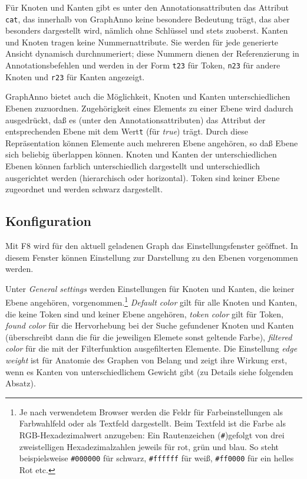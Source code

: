 \documentclass[12pt]{scrartcl}
\begin{document}
Für Knoten und Kanten gibt es unter den Annotationsattributen das Attribut \texttt{cat}, das innerhalb von GraphAnno keine besondere Bedeutung trägt, das aber besonders dargestellt wird, nämlich ohne Schlüssel und stets zuoberst.
Kanten und Knoten tragen keine Nummernattribute. Sie werden für jede generierte Ansicht dynamisch durchnumeriert; diese Nummern dienen der Referenzierung in Annotationsbefehlen und werden in der Form \texttt{t23} für Token, \texttt{n23} für andere Knoten und \texttt{r23} für Kanten angezeigt. 

GraphAnno bietet auch die Möglichkeit, Knoten und Kanten unterschiedlichen Ebenen zuzuordnen. Zugehörigkeit eines Elements zu einer Ebene wird dadurch ausgedrückt, daß es (unter den Annotationsattributen) das Attribut der entsprechenden Ebene mit dem Wert\texttt{t} (für \textit{true}) trägt. Durch diese Repräsentation können Elemente auch mehreren Ebene angehören, so daß Ebene sich beliebig überlappen können. Knoten und Kanten der unterschiedlichen Ebenen können farblich unterschiedlich dargestellt und unterschiedlich ausgerichtet werden (hierarchisch oder horizontal). Token sind keiner Ebene zugeordnet und werden schwarz dargestellt.



\subsection{Konfiguration}\label{konfiguration}

Mit F8 wird für den aktuell geladenen Graph das Einstellungsfenster geöffnet. In diesem Fenster können Einstellung zur Darstellung zu den Ebenen vorgenommen werden.

Unter \textit{General settings} werden Einstellungen für Knoten und Kanten, die keiner Ebene angehören, vorgenommen.\footnote{Je nach verwendetem Browser werden die Feldr für Farbeinstellungen als Farbwahlfeld oder als Textfeld dargestellt. Beim Textfeld ist die Farbe als RGB-Hexadezimalwert anzugeben: Ein Rautenzeichen (\texttt{\#})gefolgt von drei zweistelligen Hexadezimalzahlen jeweils für rot, grün und blau. So steht beispielsweise \texttt{\#000000} für schwarz, \texttt{\#ffffff} für weiß, \texttt{\#ff0000} für ein helles Rot etc.} \textit{Default color} gilt für alle Knoten und Kanten, die keine Token sind und keiner Ebene angehören, \textit{token color} gilt für Token, \textit{found color} für die Hervorhebung bei der Suche gefundener Knoten und Kanten (überschreibt dann die für die jeweiligen Elemete sonst geltende Farbe), \textit{filtered color} für die mit der Filterfunktion ausgefilterten Elemente. Die Einstellung \textit{edge weight} ist für Anatomie des Graphen von Belang und zeigt ihre Wirkung erst, wenn es Kanten von unterschiedlichem Gewicht gibt (zu Details siehe folgenden Absatz).
\end{document}
